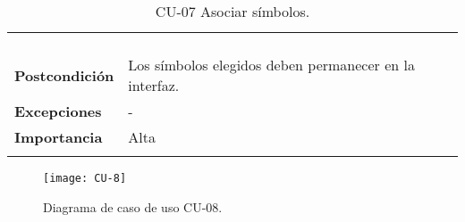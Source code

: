 \begin{longtable}[H]{@{}ll@{}}
\begin{minipage}[t]{0.71\columnwidth}
\begin{enumerate}
\end{enumerate}\strut
\end{minipage}\tabularnewline
\begin{minipage}[t]{0.23\columnwidth}\raggedright\strut
\textbf{Postcondición}\strut
\end{minipage} & \begin{minipage}[t]{0.71\columnwidth}\raggedright\strut
  Los símbolos elegidos deben permanecer en la interfaz.
\end{minipage}\tabularnewline
\begin{minipage}[t]{0.23\columnwidth}\raggedright\strut
\textbf{Excepciones}\strut
\end{minipage} & \begin{minipage}[t]{0.71\columnwidth}\raggedright\strut
-\strut
\end{minipage}\tabularnewline
\begin{minipage}[t]{0.23\columnwidth}\raggedright\strut
\textbf{Importancia}\strut
\end{minipage} & \begin{minipage}[t]{0.71\columnwidth}\raggedright\strut
Alta\strut
\end{minipage}\tabularnewline
\bottomrule
\caption{CU-07 Asociar símbolos.}
\end{longtable}
\newpage

\begin{figure}[H]
	\centering
	\texttt{[image: CU-8]}
	\caption{Diagrama de caso de uso CU-08.}
	\label{fig:CU-8}
\end{figure}


\strut

